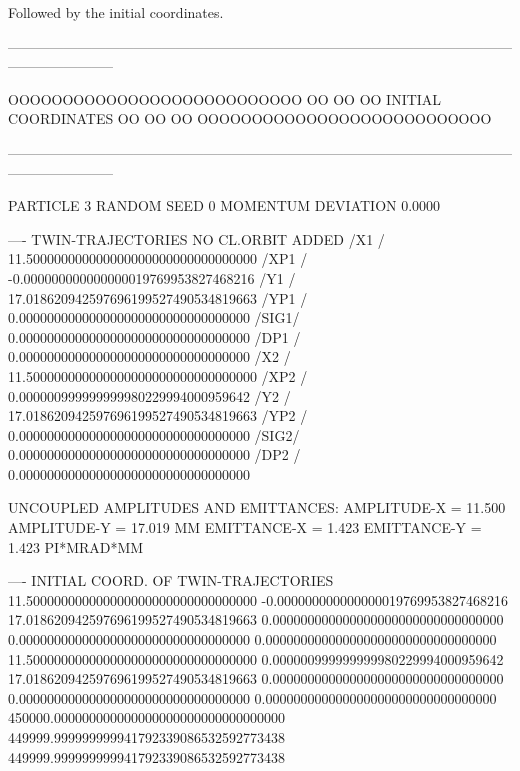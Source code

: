 
\clearpage

Followed by the initial coordinates.

\begin{ctverbatim}
-----------------------------------------------------------------------------------------------------------------------------------

         OOOOOOOOOOOOOOOOOOOOOOOOOOO
         OO                       OO
         OO  INITIAL COORDINATES  OO
         OO                       OO
         OOOOOOOOOOOOOOOOOOOOOOOOOOO

-----------------------------------------------------------------------------------------------------------------------------------



     PARTICLE       3 RANDOM SEED        0 MOMENTUM DEVIATION   0.0000    


     ---- TWIN-TRAJECTORIES NO CL.ORBIT ADDED
     /X1  /           11.500000000000000000000000000000000
     /XP1 /           -0.000000000000000019769953827468216
     /Y1  /           17.018620942597696199527490534819663
     /YP1 /            0.000000000000000000000000000000000
     /SIG1/            0.000000000000000000000000000000000
     /DP1 /            0.000000000000000000000000000000000
     /X2  /           11.500000000000000000000000000000000
     /XP2 /            0.000000999999999980229994000959642
     /Y2  /           17.018620942597696199527490534819663
     /YP2 /            0.000000000000000000000000000000000
     /SIG2/            0.000000000000000000000000000000000
     /DP2 /            0.000000000000000000000000000000000


         UNCOUPLED AMPLITUDES AND EMITTANCES:
         AMPLITUDE-X =          11.500          AMPLITUDE-Y =          17.019  MM
         EMITTANCE-X =           1.423          EMITTANCE-Y =           1.423  PI*MRAD*MM

     ---- INITIAL COORD. OF TWIN-TRAJECTORIES
                     11.500000000000000000000000000000000
                     -0.000000000000000019769953827468216
                     17.018620942597696199527490534819663
                      0.000000000000000000000000000000000
                      0.000000000000000000000000000000000
                      0.000000000000000000000000000000000
                     11.500000000000000000000000000000000
                      0.000000999999999980229994000959642
                     17.018620942597696199527490534819663
                      0.000000000000000000000000000000000
                      0.000000000000000000000000000000000
                      0.000000000000000000000000000000000
                 450000.000000000000000000000000000000000
                 449999.999999999941792339086532592773438
                 449999.999999999941792339086532592773438


\end{ctverbatim}
